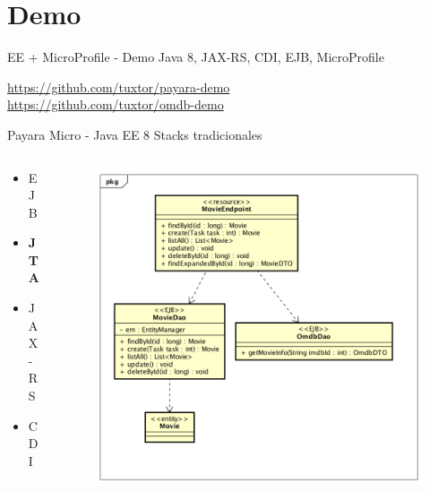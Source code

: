 \documentclass{beamer}
\begin{document}
\section{Demo}
\begin{frame}{EE + MicroProfile  - Demo}
\huge Java 8, JAX-RS, CDI, EJB, MicroProfile

\normalsize  \url{https://github.com/tuxtor/payara-demo}\\
\normalsize  \url{https://github.com/tuxtor/omdb-demo}
\end{frame}

\begin{frame}{Payara Micro - Java EE 8}
Stacks tradicionales
\begin{columns}[T] %
\begin{column}[T]{3cm} %
	\begin{itemize}
		\item EJB
		\item \textbf{JTA}
		\item JAX-RS
		\item CDI
	\end{itemize}
\end{column}
\begin{column}[T]{7cm} %
	\begin{figure}
		\centering
		\includegraphics[width=\linewidth]{Images/democlass}
	\end{figure}
\end{column}
\end{columns}
\end{frame}
\end{document}
